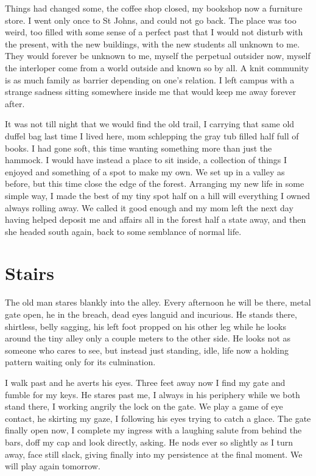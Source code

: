 \documentclass[ebook, 10pt, openright, onecolumn]{memoir}
\begin{document}
Things had changed some, the coffee shop closed, my bookshop now a furniture
store. I went only once to St Johns, and could not go back.  The place was too
weird, too filled with some sense of a perfect past that I would not disturb
with the present, with the new buildings, with the new students all unknown to
me.  They would forever be unknown to me, myself the perpetual outsider now,
myself the interloper come from a world outside and known so by all.  A knit
community is as much family as barrier depending on one's relation.  I left
campus with a strange sadness sitting somewhere inside me that would keep me
away forever after.

It was not till night that we would find the old trail, I carrying that same old
duffel bag last time I lived here, mom schlepping the gray tub filled half full
of books.  I had gone soft, this time wanting something more than just the
hammock.  I would have instead a place to sit inside, a collection of things I
enjoyed and something of a spot to make my own.  We set up in a valley as
before, but this time close the edge of the forest.  Arranging my new life in
some simple way, I made the best of my tiny spot half on a hill will everything
I owned always rolling away.  We called it good enough and my mom left the next
day having helped deposit me and affairs all in the forest half a state away,
and then she headed south again, back to some semblance of normal life.  

\chapter{Stairs}
\label{cha:stairs}

The old man stares blankly into the alley. Every afternoon he will be there,
metal gate open, he in the breach, dead eyes languid and incurious.  He stands
there, shirtless, belly sagging, his left foot propped on his other leg while he
looks around the tiny alley only a couple meters to the other side.  He looks
not as someone who cares to see, but instead just standing, idle, life now a
holding pattern waiting only for its culmination.

I walk past and he averts his eyes.  Three feet away now I find my gate and
fumble for my keys.  He stares past me, I always in his periphery while we both
stand there, I working angrily the lock on the gate.  We play a game of eye
contact, he skirting my gaze, I following his eyes trying to catch a glace.  The
gate finally open now, I complete my ingress with a laughing salute from behind the
bars, doff my cap and look directly, asking.  He nods ever so slightly as I turn
away, face still slack, giving finally into my persistence at the final
moment.  We will play again tomorrow. 
\end{document}
